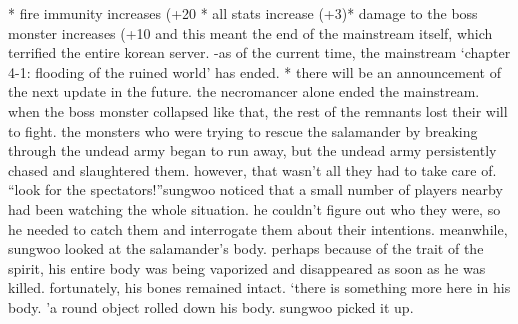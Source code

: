 * fire immunity increases (+20%
* all stats increase (+3)* damage to the boss monster increases (+10%
 and this meant the end of the mainstream itself, which terrified the entire korean server.
-as of the current time, the mainstream ‘chapter 4-1: flooding of the ruined world’ has ended.
* there will be an announcement of the next update in the future.
the necromancer alone ended the mainstream.
when the boss monster collapsed like that, the rest of the remnants lost their will to fight.
the monsters who were trying to rescue the salamander by breaking through the undead army began to run away, but the undead army persistently chased and slaughtered them.
however, that wasn’t all they had to take care of.
“look for the spectators!”sungwoo noticed that a small number of players nearby had been watching the whole situation.
he couldn’t figure out who they were, so he needed to catch them and interrogate them about their intentions.
meanwhile, sungwoo looked at the salamander’s body.
 perhaps because of the trait of the spirit, his entire body was being vaporized and disappeared as soon as he was killed.
fortunately, his bones remained intact.
‘there is something more here in his body.
’a round object rolled down his body.
sungwoo picked it up.


 